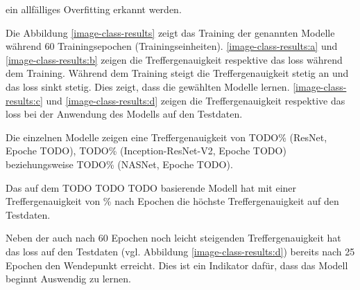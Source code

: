  ein allfälliges Overfitting erkannt werden.

Die Abbildung \ref{image-class-results} zeigt das Training der genannten Modelle während 60 Trainingsepochen (Trainingseinheiten). \ref{image-class-results:a} und \ref{image-class-results:b} zeigen die Treffergenauigkeit respektive das loss während dem Training. Während dem Training steigt die Treffergenauigkeit stetig an und das loss sinkt stetig. Dies zeigt, dass die gewählten Modelle lernen. \ref{image-class-results:c} und \ref{image-class-results:d} zeigen die Treffergenauigkeit respektive das loss bei der Anwendung des Modells auf den Testdaten. 

Die einzelnen Modelle zeigen eine Treffergenauigkeit von TODO\% (ResNet, Epoche TODO), TODO\% (Inception-ResNet-V2, Epoche TODO) beziehungsweise TODO\% (NASNet, Epoche TODO).

Das auf dem TODO TODO TODO basierende Modell hat mit einer Treffergenauigkeit von \% nach  Epochen die höchste Treffergenauigkeit auf den Testdaten. 

Neben der auch nach 60 Epochen noch leicht steigenden Treffergenauigkeit hat das loss auf den Testdaten (vgl. Abbildung \ref{image-class-results:d}) bereits nach 25 Epochen den Wendepunkt erreicht. Dies ist ein Indikator dafür, dass das Modell beginnt Auswendig zu lernen.

